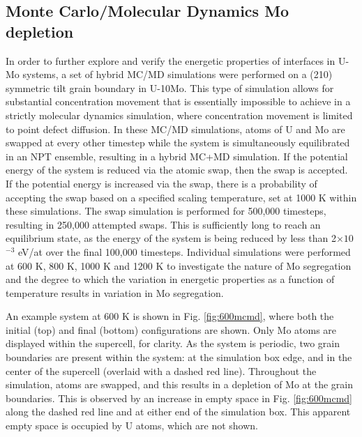 \documentclass[review]{elsarticle}
\begin{document}
\subsection{Monte Carlo/Molecular Dynamics Mo depletion}
In order to further explore and verify the energetic properties of interfaces in U-Mo systems, a set of hybrid MC/MD simulations were performed on a (210) symmetric tilt grain boundary in U-10Mo. This type of simulation allows for substantial concentration movement that is essentially impossible to achieve in a strictly molecular dynamics simulation, where concentration movement is limited to point defect diffusion. In these MC/MD simulations, atoms of U and Mo are swapped at every other timestep while the system is simultaneously equilibrated in an NPT ensemble, resulting in a hybrid MC+MD simulation. If the potential energy of the system is reduced via the atomic swap, then the swap is accepted. If the potential energy is increased via the swap, there is a probability of accepting the swap based on a specified scaling temperature, set at 1000 K within these simulations. The swap simulation is performed for 500,000 timesteps, resulting in 250,000 attempted swaps. This is sufficiently long to reach an equilibrium state, as the energy of the system is being reduced by less than 2$\times1$0$^{-3}$ eV/at over the final 100,000 timesteps. Individual simulations were performed at 600 K, 800 K, 1000 K and 1200 K to investigate the nature of Mo segregation and the degree to which the variation in energetic properties as a function of temperature results in variation in Mo segregation. 

An example system at 600 K is shown in Fig. \ref{fig:600mcmd}, where both the initial (top) and final (bottom) configurations are shown. Only Mo atoms are displayed within the supercell, for clarity. As the system is periodic, two grain boundaries are present within the system: at the simulation box edge, and in the center of the supercell (overlaid with a dashed red line). Throughout the simulation, atoms are swapped, and this results in a depletion of Mo at the grain boundaries. This is observed by an increase in empty space in Fig. \ref{fig:600mcmd} along the dashed red line and at either end of the simulation box. This apparent empty space is occupied by U atoms, which are not shown.
\end{document}
